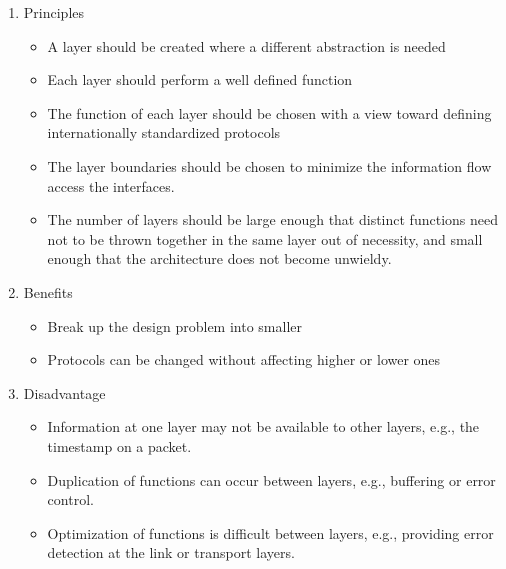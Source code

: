 \documentclass[a4paper,10pt]{article}
\begin{document}
\begin{enumerate}
\begin{enumerate}
\begin{enumerate}
          \item Principles
          \begin{itemize}
            \item A layer should be created where a different abstraction is needed
            \item Each layer should perform a well defined function
            \item The function of each layer should be chosen with a view toward defining internationally standardized protocols
            \item The layer boundaries should be chosen to minimize the information flow access the interfaces.
            \item The number of layers should be large enough that distinct functions need not to be thrown together in the same layer out of necessity, and small enough that the architecture does not become unwieldy.
          \end{itemize}
          \item Benefits
            \begin{itemize}
              \item Break up the design problem into smaller
              \item Protocols can be changed without affecting higher or lower ones
            \end{itemize}
          \item Disadvantage
            \begin{itemize}
              \item Information at one layer may not be available to other layers, e.g., the timestamp on a packet.
              \item Duplication of functions can occur between layers, e.g., buffering or error control.
              \item Optimization of functions is difficult between layers, e.g., providing error detection at the link or transport layers.
            \end{itemize}
        \end{enumerate}
      \end{enumerate}
\end{enumerate}
    
\end{document}
